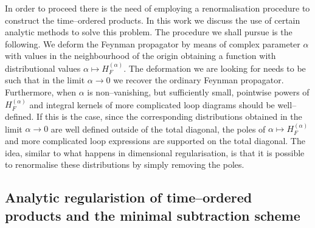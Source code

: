 \documentclass[a4paper,10pt,twoside]{article}
\numberwithin{equation}{section}
\newcounter{and}
\theoremstyle{plain}
\theoremstyle{definition}
\begin{document}
In order to proceed there is the need of employing a renormalisation procedure to construct the time--ordered products.
In this work we discuss the use of certain analytic methods to solve this problem.
The procedure we shall pursue is the following. 
We deform the Feynman propagator by means of complex parameter $\alpha$ with values in the neighbourhood of the origin obtaining a function with distributional values $\alpha \mapsto H_F^{(\alpha)}$. The deformation we are looking for needs to be such that in the limit $\alpha \to 0$ we recover the ordinary Feynman propagator. Furthermore, when $\alpha$ is non--vanishing, but sufficiently small, pointwise powers of $H^{(\alpha)}_F$ and integral kernels of more complicated loop diagrams should be well--defined. If this is the case, since the corresponding distributions obtained in the limit $\alpha\to0$ are well defined outside of the total diagonal, the poles of $\alpha \mapsto H_F^{(\alpha)}$ and more complicated loop expressions are supported on the total diagonal. 
The idea, similar to what happens in dimensional regularisation, is that it is possible to renormalise these distributions by simply removing the poles. 



\subsection{Analytic regularistion of time--ordered products and the minimal subtraction scheme}
\label{sec:analytic_general}
\end{document}
